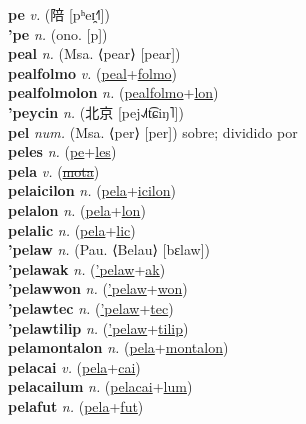 \textbf{pe} \textit{v.} ({\chinese{}陪} [pʰeɪ̯˧˥])
 \label{pe} \\
\textbf{'pe} \textit{n.} (ono. [p])
 \label{'pe} \\
\textbf{peal} \textit{n.} (Msa. ⟨pear⟩ [pear])
 \label{peal} \\
\textbf{pealfolmo} \textit{v.} (\hyperref[peal]{peal}+\hyperref[folmo]{folmo})
 \label{pealfolmo} \\
\textbf{pealfolmolon} \textit{n.} (\hyperref[pealfolmo]{pealfolmo}+\hyperref[lon]{lon})
 \label{pealfolmolon} \\
\textbf{'peycin} \textit{n.} ({\chinese{}北京} [pej˨˩˦t͡ɕiŋ˥])
 \label{'peycin} \\
\textbf{pel} \textit{num.} (Msa. ⟨per⟩ [per])
sobre; dividido por \label{pel} \\
\textbf{peles} \textit{n.} (\hyperref[pe]{pe}+\hyperref[les]{les})
 \label{peles} \\
\textbf{pela} \textit{v.} (\hyperref[mota]{\sout{mota}})
 \label{pela} \\
\textbf{pelaicilon} \textit{n.} (\hyperref[pela]{pela}+\hyperref[icilon]{icilon})
 \label{pelaicilon} \\
\textbf{pelalon} \textit{n.} (\hyperref[pela]{pela}+\hyperref[lon]{lon})
 \label{pelalon} \\
\textbf{pelalic} \textit{n.} (\hyperref[pela]{pela}+\hyperref[lic]{lic})
 \label{pelalic} \\
\textbf{'pelaw} \textit{n.} (Pau. ⟨Belau⟩ [bɛlaw])
 \label{'pelaw} \\
\textbf{'pelawak} \textit{n.} (\hyperref['pelaw]{'pelaw}+\hyperref[ak]{ak})
 \label{'pelawak} \\
\textbf{'pelawwon} \textit{n.} (\hyperref['pelaw]{'pelaw}+\hyperref[won]{won})
 \label{'pelawwon} \\
\textbf{'pelawtec} \textit{n.} (\hyperref['pelaw]{'pelaw}+\hyperref[tec]{tec})
 \label{'pelawtec} \\
\textbf{'pelawtilip} \textit{n.} (\hyperref['pelaw]{'pelaw}+\hyperref[tilip]{tilip})
 \label{'pelawtilip} \\
\textbf{pelamontalon} \textit{n.} (\hyperref[pela]{pela}+\hyperref[montalon]{montalon})
 \label{pelamontalon} \\
\textbf{pelacai} \textit{v.} (\hyperref[pela]{pela}+\hyperref[cai]{cai})
 \label{pelacai} \\
\textbf{pelacailum} \textit{n.} (\hyperref[pelacai]{pelacai}+\hyperref[lum]{lum})
 \label{pelacailum} \\
\textbf{pelafut} \textit{n.} (\hyperref[pela]{pela}+\hyperref[fut]{fut})
